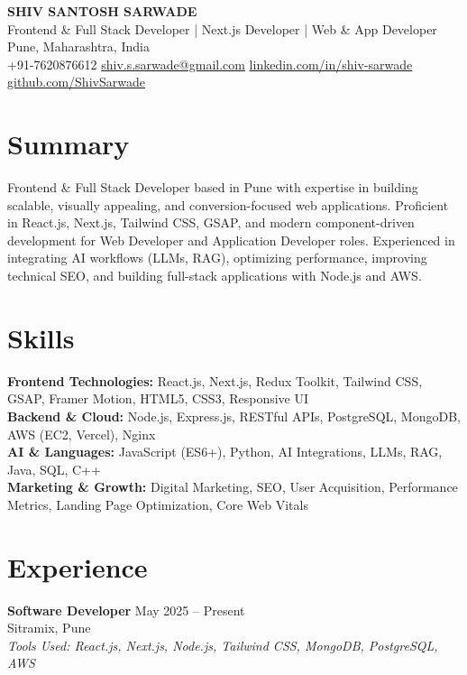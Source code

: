 \documentclass[a4paper,10pt]{article}
\begin{document}
\pagestyle{empty}

\begin{center}
    {\LARGE \textbf{SHIV SANTOSH SARWADE}}\\
    Frontend \& Full Stack Developer | Next.js Developer | Web \& App Developer\\[4pt]
    Pune, Maharashtra, India\\
    +91-7620876612 \quad
    \href{mailto:shiv.s.sarwade@gmail.com}{shiv.s.sarwade@gmail.com} \quad
    \href{https://linkedin.com/in/shiv-sarwade}{linkedin.com/in/shiv-sarwade} \quad
    \href{https://github.com/ShivSarwade}{github.com/ShivSarwade}
\end{center}

\section*{Summary}

Frontend \& Full Stack Developer based in Pune with expertise in building scalable, visually appealing, and conversion-focused web applications. Proficient in React.js, Next.js, Tailwind CSS, GSAP, and modern component-driven development for Web Developer and Application Developer roles. Experienced in integrating AI workflows (LLMs, RAG), optimizing performance, improving technical SEO, and building full-stack applications with Node.js and AWS.

\section*{Skills}

\textbf{Frontend Technologies:} React.js, Next.js, Redux Toolkit, Tailwind CSS, GSAP, Framer Motion, HTML5, CSS3, Responsive UI\\
\textbf{Backend \& Cloud:} Node.js, Express.js, RESTful APIs, PostgreSQL, MongoDB, AWS (EC2, Vercel), Nginx\\
\textbf{AI \& Languages:} JavaScript (ES6+), Python, AI Integrations, LLMs, RAG, Java, SQL, C++\\
\textbf{Marketing \& Growth:} Digital Marketing, SEO, User Acquisition, Performance Metrics, Landing Page Optimization, Core Web Vitals

\section*{Experience}

\textbf{Software Developer} \hfill May 2025 -- Present\\
Sitramix, Pune\\
\textit{Tools Used: React.js, Next.js, Node.js, Tailwind CSS, MongoDB, PostgreSQL, AWS}
\end{document}
